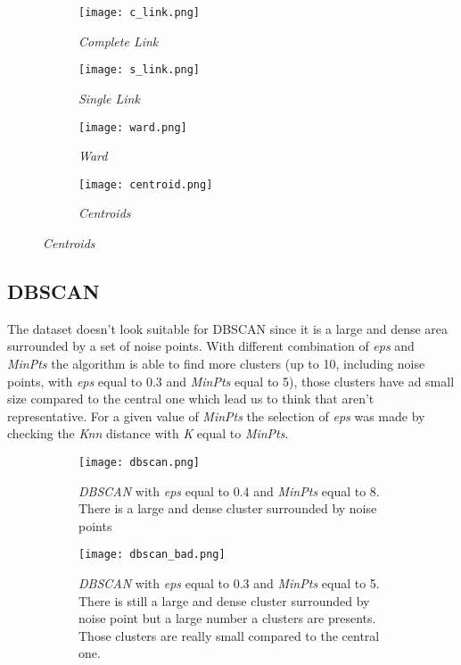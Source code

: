 \documentclass{article}
\begin{document}
\begin{figure}[h!]
    \centering
    \begin{subfigure}{0.49\textwidth}
        \centering
        \texttt{[image: c\_link.png]}
        \caption{\emph{Complete Link}}
        \label{fig:clink_img}
    \end{subfigure}
    \begin{subfigure}{0.49\textwidth}
        \centering
        \texttt{[image: s\_link.png]}
        \caption{\emph{Single Link}}
        \label{fig:slink_img}
    \end{subfigure}
    \begin{subfigure}{0.49\textwidth}
        \centering
        \texttt{[image: ward.png]}
        \caption{\emph{Ward}}
        \label{fig:ward_img}
    \end{subfigure}
    \begin{subfigure}{0.49\textwidth}
         \centering
         \texttt{[image: centroid.png]}
         \caption{\emph{Centroids}}
         \label{fig:centr_img}
     \end{subfigure}
    \label{fig:dendograms}
\end{figure}

\subsection{DBSCAN}
The dataset doesn't look suitable for DBSCAN since it is a large and dense area surrounded by a set of noise points. With different combination of \emph{eps} and \emph{MinPts} the algorithm is able to find more clusters (up to 10, including noise points, with \emph{eps} equal to 0.3 and \emph{MinPts} equal to 5), those clusters have ad small size compared to the central one which lead us to think that aren't representative. For a given value of \emph{MinPts} the selection of \emph{eps} was made by checking the \emph{Knn} distance with \emph{K} equal to \emph{MinPts}.

\begin{figure}[ht]
    \centering
    \begin{subfigure}{0.46\paperwidth}
        \centering
        \texttt{[image: dbscan.png]}
        \caption{\emph{DBSCAN} with \emph{eps} equal to 0.4 and \emph{MinPts} equal to 8. There is a large and dense cluster surrounded by noise points}
        \label{fig:dbscan_good}
    \end{subfigure}
    \begin{subfigure}{0.45\paperwidth}
        \centering
        \texttt{[image: dbscan\_bad.png]}
        \caption{\emph{DBSCAN} with \emph{eps} equal to 0.3 and \emph{MinPts} equal to 5. There is still a large and dense cluster surrounded by noise point but a large number a clusters are presents. Those clusters are really small compared to the central one.}
        \label{fig:dbscan_bad}
    \end{subfigure}
    \caption{}
    \label{fig:dbscan}
\end{figure}
\end{document}
